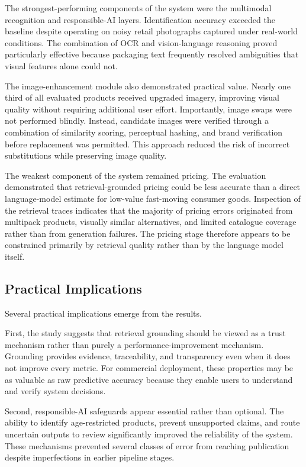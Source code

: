 \documentclass[conference]{IEEEtran}
\begin{document}
The strongest-performing components of the system were the multimodal
recognition and responsible-AI layers. Identification accuracy exceeded the
baseline despite operating on noisy retail photographs captured under
real-world conditions. The combination of OCR and vision-language reasoning
proved particularly effective because packaging text frequently resolved
ambiguities that visual features alone could not. 

The image-enhancement module also demonstrated practical value. Nearly one
third of all evaluated products received upgraded imagery, improving visual
quality without requiring additional user effort. Importantly, image swaps
were not performed blindly. Instead, candidate images were verified through
a combination of similarity scoring, perceptual hashing, and brand
verification before replacement was permitted. This approach reduced the
risk of incorrect substitutions while preserving image quality. 

The weakest component of the system remained pricing. The evaluation
demonstrated that retrieval-grounded pricing could be less accurate than a
direct language-model estimate for low-value fast-moving consumer goods.
Inspection of the retrieval traces indicates that the majority of pricing
errors originated from multipack products, visually similar alternatives,
and limited catalogue coverage rather than from generation failures. The
pricing stage therefore appears to be constrained primarily by retrieval
quality rather than by the language model itself. 

\subsection{Practical Implications}

Several practical implications emerge from the results.

First, the study suggests that retrieval grounding should be viewed as a
trust mechanism rather than purely a performance-improvement mechanism.
Grounding provides evidence, traceability, and transparency even when it
does not improve every metric. For commercial deployment, these properties
may be as valuable as raw predictive accuracy because they enable users to
understand and verify system decisions. 

Second, responsible-AI safeguards appear essential rather than optional.
The ability to identify age-restricted products, prevent unsupported
claims, and route uncertain outputs to review significantly improved the
reliability of the system. These mechanisms prevented several classes of
error from reaching publication despite imperfections in earlier pipeline
stages. 
\end{document}
